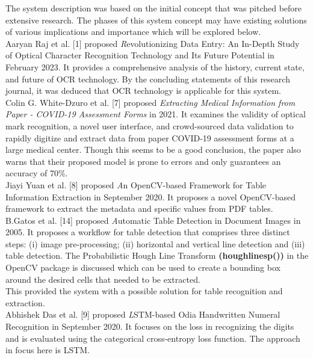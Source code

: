 \noindent
The system description was based on the initial concept that was pitched before extensive research. The phases of this system concept may have existing solutions of various implications and importance which will be explored below.\\

\noindent
Aaryan Raj et al. [1] proposed {\textit Revolutionizing Data Entry: An In-Depth Study of Optical Character Recognition Technology and Its Future Potential} in February 2023.
\noindent
It provides a comprehensive analysis of the history, current state, and future of OCR technology. By the concluding statements of this research journal, it was deduced that OCR technology is applicable for this system.\\

\noindent
Colin G. White-Dzuro et al. [7] proposed {\it Extracting Medical Information from Paper - COVID-19 Assessment Forms} in 2021. 
\noindent
It examines the validity of optical mark recognition, a novel user interface, and crowd-sourced data validation to rapidly digitize and extract data from paper COVID-19 assessment forms at a large medical center. Though this seems to be a good conclusion, the paper also warns that their proposed model is prone to errors and only guarantees an accuracy of 70\%.\\

\noindent
Jiayi Yuan et al. [8] proposed {\textit An OpenCV-based Framework for Table Information Extraction} in September 2020. 
\noindent
It proposes a novel OpenCV-based framework to extract the metadata and specific values from PDF tables. \\

\noindent
B.Gatos et al. [14] proposed {\textit Automatic Table Detection in Document Images} in 2005. 
\noindent
It proposes a workflow for table detection that comprises three distinct steps: (i) image pre-processing; (ii) horizontal and vertical line detection and (iii) table detection. The Probabilistic Hough Line Transform \textbf{(houghlinesp())} in the OpenCV package is discussed which can be used to create a bounding box around the desired cells that needed to be extracted. \\

\noindent This provided the system with a possible solution for table recognition and extraction. \\

\noindent
Abhishek Das et al. [9] proposed {\textit LSTM-based  Odia  Handwritten  Numeral Recognition} in September 2020.
\noindent
It focuses on the loss in recognizing the digits and is evaluated using the categorical cross-entropy loss function. The approach in focus here is LSTM.\\

